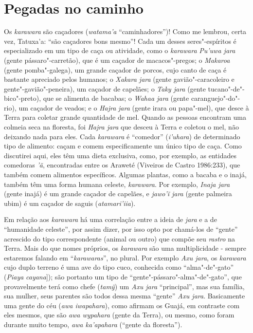 \section{Pegadas no caminho}\label{pegadas-no-caminho}

Os \emph{karawara} são caçadores (\emph{watama'a} ``caminhadores'')!
Como me lembrou, certa vez, Tatuxa'a: ``são caçadores bons mesmo''! Cada
um desses seres"-espíritos é especializado em um tipo de caça ou
atividade, como o \emph{karawara} \emph{Pu'uwa jara} (gente
pássaro"-carretão), que é um caçador de macacos"-pregos; o \emph{Makaroa}
(gente pomba"-galega), um grande caçador de porcos, cujo canto de caça é
bastante apreciado pelos humanos; o \emph{Xakara jara} (gente
gavião"-caracoleiro e gente"-gavião"-peneira), um caçador de capelães; o
\emph{Taky jara} (gente tucano"-de"-bico"-preto), que se alimenta de
bacabas; o \emph{Wahaa jara} (gente caranguejo"-do"-rio), um caçador de
veados; e o \emph{Hajra} \emph{jara} (gente irara ou papa"-mel), que
desce à Terra para coletar grande quantidade de mel. Quando as pessoas
encontram uma colmeia seca na floresta, foi \emph{Hajra jara} que desceu
à Terra e coletou o mel, não deixando nada para eles. Cada
\emph{karawara} é ``comedor'' (\emph{i'uhara}) de determinado tipo de
alimento: caçam e comem especificamente um único tipo de caça. Como
discutirei aqui, eles têm uma dieta exclusiva, como, por exemplo, as
entidades comedoras \emph{'ã}, encontradas entre os Araweté (Viveiros de
Castro 1986:233), que também comem alimentos específicos. Algumas
plantas, como a bacaba e o inajá, também têm uma forma humana celeste,
\emph{karawara}. Por exemplo, \emph{Inaja jara} (gente inajá) é um
grande caçador de capelães, e \emph{jawo'ĩ jara} (gente palmeira ubim) é
um caçador de saguis (\emph{atamari'iia}).

Em relação aos \emph{karawara} há uma correlação entre a ideia de
\emph{jara} e a de ``humanidade celeste'', por assim dizer, por isso opto
por chamá-los de ``gente'' acrescido do tipo correspondente (animal ou
outro) que compõe seu \emph{rastro} na Terra. Mais do que nomes
próprios, os \emph{karawara} são uma multiplicidade - sempre estaremos
falando em ``\emph{karawaras}'', no plural. Por exemplo \emph{Axu jara},
os \emph{karawara} cujo duplo terreno é uma ave do tipo cuco, conhecida
como ``alma"-de"-gato'' (\emph{Piaya} \emph{cayana}{]}); são portanto um
tipo de ``gente"-pássaro"-alma"-de"-gato'', que provavelmente terá como
chefe (\emph{tamỹ}) um \emph{Axu jara} ``principal'', mas sua família,
sua mulher, seus parentes são todos dessa mesma ``gente'' \emph{Axu
jara}. Basicamente uma gente do céu (\emph{awa iwapahara}), como afirmam
os Guajá, em contraste com eles mesmos, que são \emph{awa wypahara}
(gente da Terra), ou mesmo, como foram durante muito tempo, \emph{awa
ka'apahara} (``gente da floresta'').

